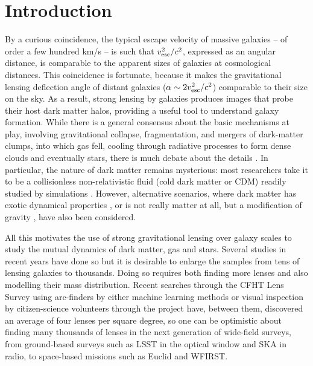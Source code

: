 
\section{Introduction}

By a curious coincidence, the typical escape velocity of massive
galaxies -- of order a few hundred km/s -- is such that $v_{\rm
  esc}^2/c^2$, expressed as an angular distance, is comparable to the
apparent sizes of galaxies at cosmological distances.  This
coincidence is fortunate, because it makes the gravitational lensing
deflection angle of distant galaxies ($\alpha\sim 2v_{\rm esc}^2/c^2$)
comparable to their size on the sky. As a result, strong lensing by
galaxies produces images that probe their host dark matter halos,
providing a useful tool to understand galaxy formation.  While there
is a general consensus about the basic mechanisms at play, involving
gravitational collapse, fragmentation, and mergers of dark-matter
clumps, into which gas fell, cooling through radiative processes to
form dense clouds and eventually stars, there is much debate about the
details \citep[for a summary, see][]{2012RAA....12..917S}.  In
particular, the nature of dark matter remains mysterious: most
researchers take it to be a collisionless non-relativistic fluid (cold
dark matter or CDM) readily studied by simulations \citep[for example,
  the influential Millennium
  simulation,][]{2005Natur.435..629S}. However, alternative scenarios,
where dark matter has exotic dynamical properties
\citep{2010MNRAS.405...77S,2016ApJ...818...89S}, or is not really
matter at all, but a modification of gravity
\citep{2016PhRvL.117t1101M}, have also been considered.

All this motivates the use of strong gravitational lensing over galaxy
scales to study the mutual dynamics of dark matter, gas and stars.
Several studies in recent years have done so \citep[see,
  e.g.,][]{2009ApJ...703L..51K,2011ApJ...740...97L,2012MNRAS.424..104L,
  2016MNRAS.459.3677L,2016MNRAS.456..870B} but it is desirable to
enlarge the samples from tens of lensing galaxies to thousands.  Doing
so requires both finding more lenses and also modelling their mass
distribution.  Recent searches through the CFHT Lens Survey
\citep[CFHTLS,][]{2012MNRAS.427..146H} using arc-finders
\citep[e.g.,][]{2012ApJ...749...38M,2014A&A...567A.111M,2014ApJ...785..144G,2017arXiv170401585S}
by either machine learning methods 
\citep[e.g.,][]{2016A&A...592A..75P,2017arXiv170302642L} or visual
inspection by citizen-science volunteers through the \SW project 
\citep{2016MNRAS.455.1191M} have, between them, discovered an average
of four lenses per square degree, so one can be optimistic about
finding many thousands of lenses in the next generation of wide-field
surveys, from ground-based surveys such as LSST in the optical window
and SKA in radio, to space-based missions such as Euclid and WFIRST.

